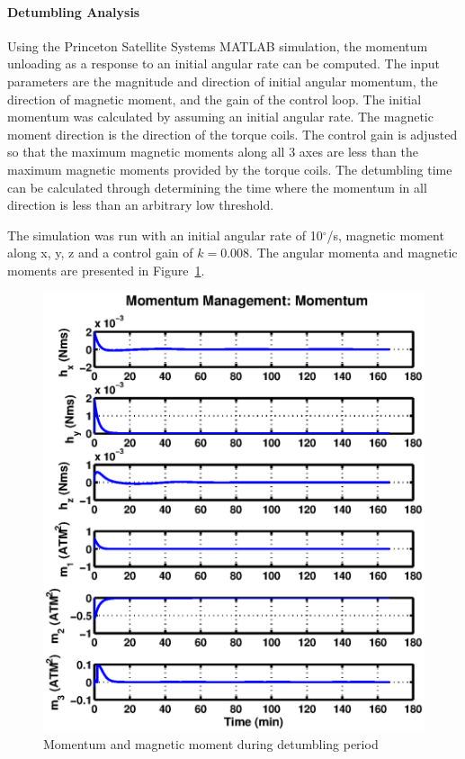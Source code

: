 \documentclass[12pt]{article}
\begin{document}
			\paragraph{Detumbling Analysis}
				Using the Princeton Satellite Systems MATLAB simulation, the momentum unloading as a response to an initial angular rate can be computed. The input parameters are the magnitude and direction of initial angular momentum, the direction of magnetic moment, and the gain of the control loop. The initial momentum was calculated by assuming an initial angular rate. The magnetic moment direction is the direction of the torque coils. The control gain is adjusted so that the maximum magnetic moments along all 3 axes are less than the maximum magnetic moments provided by the torque coils. The detumbling time can be calculated through determining the time where the momentum in all direction is less than an arbitrary low threshold. 

The simulation was run with an initial angular rate of 10$^\circ$/s, magnetic moment along x, y, z and a control gain of $k =0.008$. The angular momenta and magnetic moments are presented in Figure~\ref{fig:ADCS_detumbling}.
			
			\begin{figure}[!ht]
				\centering
				\includegraphics[scale=0.8]{images/ADCS_detumbling.eps}
				\caption{Momentum and magnetic moment during detumbling period}
				\label{fig:ADCS_detumbling}
			\end{figure}
\end{document}
